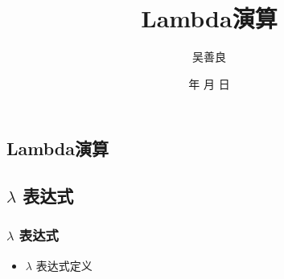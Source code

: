 \documentclass[CJKutf8,compress,hyperref]{beamer}
\renewcommand{\today}{\number\year 年 \number\month 月 \number\day 日}
\begin{document}
\begin{CJK}{UTF8}{song}
         
        \title{ Lambda演算}
        \author{ 吴善良}
        \date{ \today}


        \frame{\titlepage}
        \tableofcontents
        \section{ Lambda演算}
        \subsection{  $\lambda$ 表达式}

        \begin{frame}
                \frametitle{ $\lambda$ 表达式}
                \begin{itemize}

                        \item $\lambda$ 表达式定义
                \end{itemize}
        \end{frame}


\end{CJK}
\end{document}
